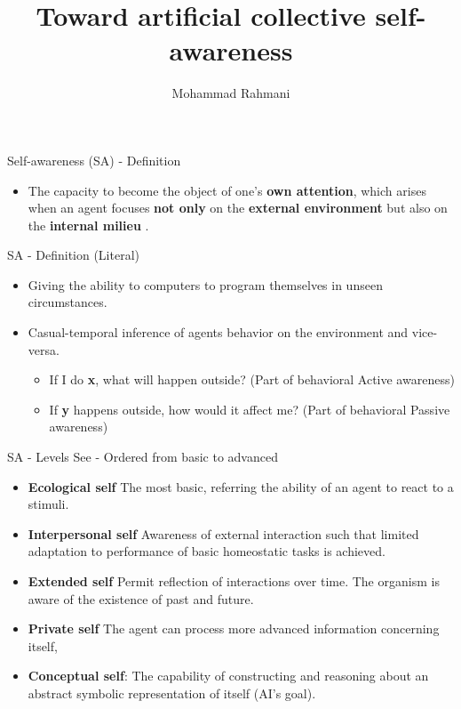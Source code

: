 \documentclass[handout]{beamer}
\title{Toward artificial collective self-awareness}
\author{Mohammad Rahmani}
\institute{Decide Doctrol Group}
\begin{document}
\begin{frame}
	\maketitle
\end{frame}

\begin{frame}{Self-awareness (SA) - Definition}
	\begin{itemize}
		\item The capacity to become the object of one’s \textbf{own attention}, which arises when an agent focuses \textbf{not only} on the \textbf{external environment} but also on the \textbf{internal milieu} \cite{morin-2006-levels-of-consciousness-and-self-awareness-a-comparison-and-integration-of-various-neurocognitive-views}. 
	\end{itemize}
\end{frame}

\begin{frame}{SA - Definition (Literal)}
	\begin{itemize}
		\item Giving the ability to computers to program themselves in unseen circumstances.
		\item Casual-temporal inference of agents behavior on the environment and vice-versa. 
			\begin{itemize}
				\item If I do \textbf{x}, what will happen outside? (Part of behavioral Active awareness)
				\item If \textbf{y} happens outside, how would it affect me? (Part of behavioral Passive awareness)
			\end{itemize}
	\end{itemize}
\end{frame}

\begin{frame}{SA - Levels}
	See \cite{lewis-2017-towards-a-framework-for-the-levels-and-aspects-of-self-aware-computing-systems} - Ordered from basic to advanced
	\begin{itemize}
		\item \textbf{Ecological self} The most basic, referring the ability of an agent to react to a stimuli.
		
		\item \textbf{Interpersonal self} Awareness of external interaction such that limited adaptation to performance of basic homeostatic tasks is achieved.
		
		\item \textbf{Extended self}  Permit reflection of interactions over time. The organism is aware of the existence of past and future.
		
		\item \textbf{Private self} The agent can process more advanced information concerning itself,
		
		\item \textbf{Conceptual self}: The capability of constructing and reasoning
		about an abstract symbolic representation of itself (AI's goal).
	\end{itemize}
\end{frame}
\end{document}
